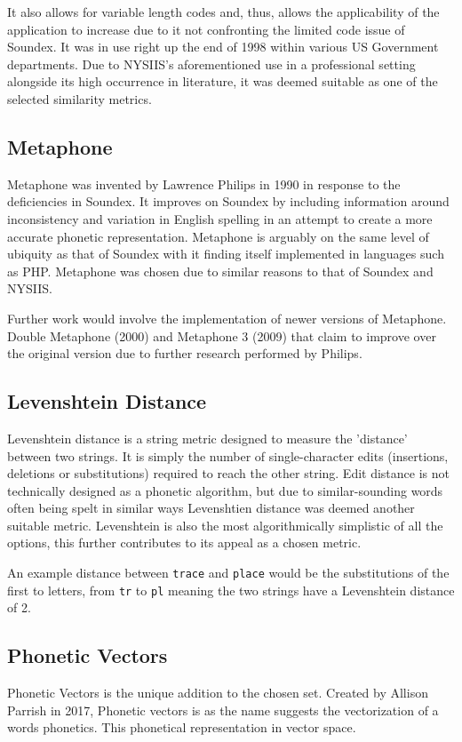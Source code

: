 It also allows for variable length codes and, thus, allows the applicability of the application to increase due to it not confronting the limited code issue of Soundex. It was in use right up the end of 1998 within various US Government departments. Due to NYSIIS's aforementioned use in a professional setting alongside its high occurrence in literature, it was deemed suitable as one of the selected similarity metrics.

\subsection{Metaphone}
Metaphone was invented by Lawrence Philips in 1990\cite{philips1990hanging} in response to the deficiencies in Soundex. It improves on Soundex by including information around inconsistency and variation in English spelling in an attempt to create a more accurate phonetic representation. Metaphone is arguably on the same level of ubiquity as that of Soundex with it finding itself implemented in languages such as PHP\cite{php}. Metaphone was chosen due to similar reasons to that of Soundex and NYSIIS. 

Further work would involve the implementation of newer versions of Metaphone. Double Metaphone (2000) and Metaphone 3 (2009) that claim to improve over the original version due to further research performed by Philips. 

\subsection{Levenshtein Distance}
Levenshtein distance is a string metric designed to measure the 'distance' between two strings. It is simply the number of single-character edits (insertions, deletions or substitutions) required to reach the other string. Edit distance is not technically designed as a phonetic algorithm, but due to similar-sounding words often being spelt in similar ways\cite{hettiarachchi2012sparcl} Levenshtien distance was deemed another suitable metric. Levenshtein is also the most algorithmically simplistic of all the options, this further contributes to its appeal as a chosen metric.

An example distance between \verb|trace| and \verb|place| would be the substitutions of the first to letters, from \verb|tr| to \verb|pl| meaning the two strings have a Levenshtein distance of 2.

\subsection{Phonetic Vectors}
Phonetic Vectors is the unique addition to the chosen set. Created by Allison Parrish in 2017\cite{parrish2017poetic}, Phonetic vectors is as the name suggests the vectorization of a words phonetics. This phonetical representation in vector space.

